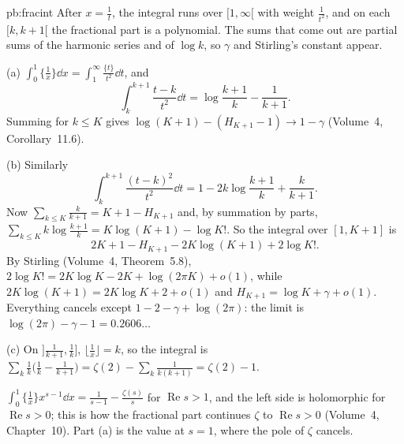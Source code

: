 \begin{solution}{pb:fracint}
\idea After $x=\frac1t$, the integral runs over $[1,\infty[$ with weight $\frac1{t^2}$, and on each $[k,k+1[$ the fractional part is a
polynomial. The sums that come out are partial sums of the harmonic series and of $\log k$, so $\gamma$ and Stirling's constant appear.

\writeup (a) $\int_0^1\{\frac1x\}\dd x=\int_1^\infty\frac{\{t\}}{t^2}\dd t$, and
\[
\int_k^{k+1}\frac{t-k}{t^2}\dd t=\log\frac{k+1}k-\frac1{k+1}.
\]
Summing for $k\le K$ gives $\log(K+1)-(H_{K+1}-1)\to1-\gamma$ (Volume~4, Corollary~11.6).

(b) Similarly
\[
\int_k^{k+1}\frac{(t-k)^2}{t^2}\dd t=1-2k\log\frac{k+1}k+\frac k{k+1}.
\]
Now $\sum_{k\le K}\frac k{k+1}=K+1-H_{K+1}$ and, by summation by parts,
$\sum_{k\le K}k\log\frac{k+1}k=K\log(K+1)-\log K!$. So the integral over $[1,K+1]$ is
\[
2K+1-H_{K+1}-2K\log(K+1)+2\log K!.
\]
By Stirling (Volume~4, Theorem~5.8), $2\log K!=2K\log K-2K+\log(2\pi K)+o(1)$, while $2K\log(K+1)=2K\log K+2+o(1)$ and $H_{K+1}=\log K+\gamma+o(1)$.
Everything cancels except $1-2-\gamma+\log(2\pi)$: the limit is $\log(2\pi)-\gamma-1=0.2606\ldots$

(c) On $]\frac1{k+1},\frac1k]$, $\lfloor\frac1x\rfloor=k$, so the integral is $\sum_k\frac1k\bigl(\frac1k-\frac1{k+1}\bigr)=\zeta(2)-\sum_k\frac1{k(k+1)}=\zeta(2)-1$.

\leads $\int_0^1\{\frac1x\}x^{s-1}\dd x=\frac1{s-1}-\frac{\zeta(s)}s$ for $\operatorname{Re}s>1$, and the left side is holomorphic for $\operatorname{Re}s>0$; this is how the
fractional part continues $\zeta$ to $\operatorname{Re}s>0$ (Volume~4, Chapter~10). Part (a) is the value at $s=1$, where the pole of $\zeta$ cancels.
\end{solution}

